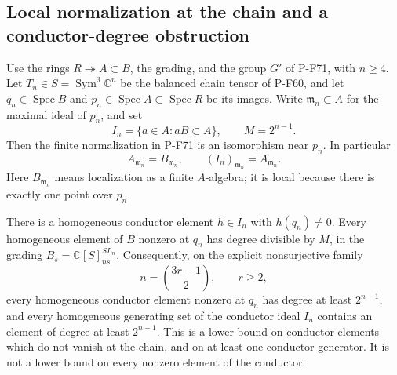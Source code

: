 \subsection{Local normalization at the chain and a conductor-degree obstruction}

\begin{proposition}
\label{prop:localconductor}
Use the rings $R\twoheadrightarrow A\subset B$, the grading,
and the group $G'$ of P-F71, with $n\ge4$.
Let $T_n\in S=\operatorname{Sym}^3\mathbb C^n$ be the
balanced chain tensor of P-F60, and let $q_n\in\operatorname{Spec}B$
and $p_n\in\operatorname{Spec}A\subset\operatorname{Spec}R$
be its images.  Write $\mathfrak m_n\subset A$ for the
maximal ideal of $p_n$, and set
\[
 I_n=\{a\in A:aB\subset A\},\qquad M=2^{n-1}.
                                                               \tag{P-F75a}
\]
Then the finite normalization in P-F71 is an isomorphism
near $p_n$.  In particular
\[
 A_{\mathfrak m_n}=B_{\mathfrak m_n},\qquad
 (I_n)_{\mathfrak m_n}=A_{\mathfrak m_n}.
                                                               \tag{P-F75b}
\]
Here $B_{\mathfrak m_n}$ means localization as a finite
$A$-algebra; it is local because there is exactly one point
over $p_n$.

There is a homogeneous conductor element $h\in I_n$ with
$h(q_n)\ne0$.  Every homogeneous element of $B$ nonzero
at $q_n$ has degree divisible by $M$, in the grading
$B_s=\mathbb C[S]_{ns}^{SL_n}$.  Consequently, on the
explicit nonsurjective family
\[
 n=\binom{3r-1}{2},\qquad r\ge2,
                                                               \tag{P-F75c}
\]
every homogeneous conductor element nonzero at $q_n$
has degree at least $2^{n-1}$, and every homogeneous
generating set of the conductor ideal $I_n$ contains
an element of degree at least $2^{n-1}$.
This is a lower bound on conductor elements which do
not vanish at the chain, and on at least one conductor
generator.  It is not a lower bound on every nonzero
element of the conductor.
\end{proposition}

